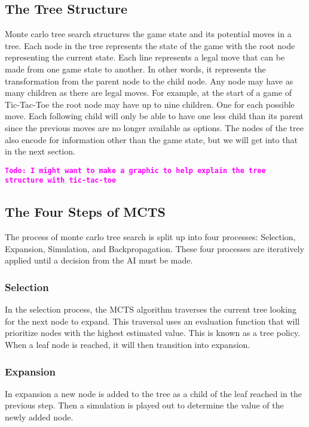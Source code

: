 \documentclass{sig-alternate}
\newcommand{\comment}[1]{{\bf \tt  {#1}}}
\newcommand{\todo}[1]{\textcolor{magenta}{\comment{Todo: {#1}}}}
\begin{document}
\subsection{The Tree Structure}
Monte carlo tree search structures the game state and its potential moves in a tree. Each node in the tree represents the state of the game with the root node representing the current state. Each line represents a legal move that can be made from one game state to another. In other words, it represents the transformation from the parent node to the child node. Any node may have as many children as there are legal moves. For example, at the start of a game of Tic-Tac-Toe the root node may have up to nine children. One for each possible move. Each following child will only be able to have one less child than its parent since the previous moves are no longer available as options. The nodes of the tree also encode for information other than the game state, but we will get into that in the next section.~\cite{Brand:2014:SEA:2664591.2664612}

\todo{I might want to make a graphic to help explain the tree structure with tic-tac-toe}

\subsection{The Four Steps of MCTS}
The process of monte carlo tree search is split up into four processes: Selection, Expansion, Simulation, and Backpropagation. These four processes are iteratively applied until a decision from the AI must be made.

\subsubsection{Selection}
In the selection process, the MCTS algorithm traverses the current tree looking for the next node to expand. This traversal uses an evaluation function that will prioritize nodes with the highest estimated value. This is known as a tree policy. When a leaf node is reached, it will then transition into expansion.

\subsubsection{Expansion}
In expansion a new node is added to the tree as a child of the leaf reached in the previous step. Then a simulation is played out to determine the value of the newly added node.
\end{document}
